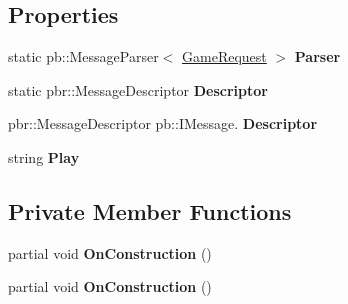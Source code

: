 \subsection*{Properties}
\begin{DoxyCompactItemize}
\item 
\mbox{\label{class_coinche_1_1_google_1_1_protobuf_1_1_game_request_ae323bbaf87bb01874f82e4e1bb0e3ba8}} 
static pb\+::\+Message\+Parser$<$ \hyperlink{class_coinche_1_1_google_1_1_protobuf_1_1_game_request}{Game\+Request} $>$ {\bfseries Parser}
\item 
\mbox{\label{class_coinche_1_1_google_1_1_protobuf_1_1_game_request_a28eca4d785d844550fdcbf7c3a354ddf}} 
static pbr\+::\+Message\+Descriptor {\bfseries Descriptor}
\item 
\mbox{\label{class_coinche_1_1_google_1_1_protobuf_1_1_game_request_af3afd1c61a0fe717f5672ce3dd7adc0f}} 
pbr\+::\+Message\+Descriptor pb\+::\+I\+Message. {\bfseries Descriptor}
\item 
\mbox{\label{class_coinche_1_1_google_1_1_protobuf_1_1_game_request_a7c66f830a9141b27c66d76e732b51dec}} 
string {\bfseries Play}
\end{DoxyCompactItemize}
\subsection*{Private Member Functions}
\begin{DoxyCompactItemize}
\item 
\mbox{\label{class_coinche_1_1_google_1_1_protobuf_1_1_game_request_a171e29f804e27af68454bfeb3862b58e}} 
partial void {\bfseries On\+Construction} ()
\item 
\mbox{\label{class_coinche_1_1_google_1_1_protobuf_1_1_game_request_a171e29f804e27af68454bfeb3862b58e}} 
partial void {\bfseries On\+Construction} ()
\end{DoxyCompactItemize}
